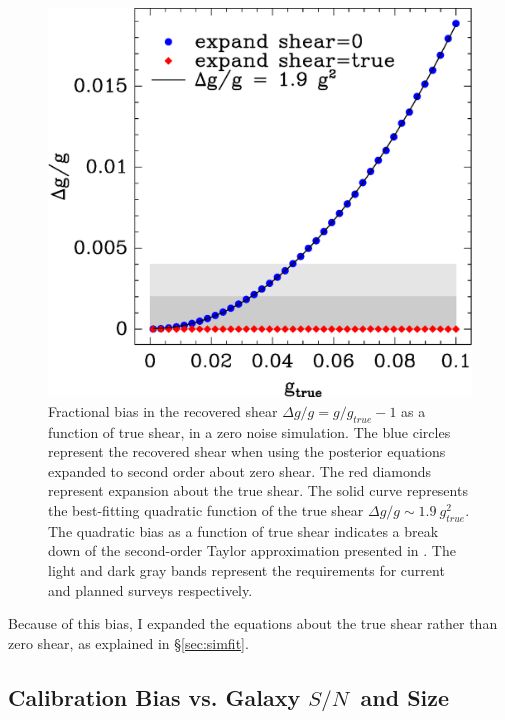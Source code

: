 \documentclass[12pt,preprint]{aastex}
\newcommand{\sn}{$S/N$}
\begin{document}
\begin{figure}[t] \centering
 \centering 
 \includegraphics[scale=0.6]{figures/fracerr-vs-shear.eps}

 \caption{Fractional bias in the recovered shear $\Delta g/g = g/g_{true}-1$
     as a function of true shear,
     in a zero noise simulation.  The blue circles represent the recovered
     shear when using the posterior equations expanded to second order about
     zero shear.  The red diamonds represent expansion about the true shear.
     The solid curve represents the best-fitting quadratic function of the true
     shear $\Delta g/g \sim 1.9~g^2_{true}$.  The quadratic bias as a function of
     true shear indicates a break down of the second-order Taylor approximation
 presented in \cite{ba14}. The light and dark gray bands represent the
 requirements for current and planned surveys respectively.
 \label{fig:nonoise}}

\end{figure}

Because of this bias, I expanded the equations about the true shear rather than
zero shear, as explained in \S \ref{sec:simfit}.

\subsection{Calibration Bias vs. Galaxy \sn\ and Size} \label{sec:snbias}
\end{document}
